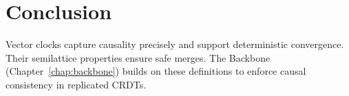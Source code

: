 \section{Conclusion}

Vector clocks capture causality precisely and support deterministic convergence. Their semilattice properties ensure safe merges. The Backbone (Chapter~\ref{chap:backbone}) builds on these definitions to enforce causal consistency in replicated CRDTs.

\endinput
